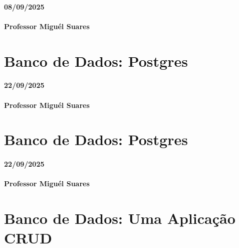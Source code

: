 \documentclass[
]{book}
\begin{document}
\subsubsection*{08/09/2025}\label{section-8}

\subsubsection*{Professor Miguél Suares}\label{professor-miguuxe9l-suares-8}

\chapter{Banco de Dados: Postgres}\label{banco-de-dados-postgres}

\subsubsection*{22/09/2025}\label{section-9}

\subsubsection*{Professor Miguél Suares}\label{professor-miguuxe9l-suares-9}

\chapter{Banco de Dados: Postgres}\label{banco-de-dados-postgres-1}

\subsubsection*{22/09/2025}\label{section-10}

\subsubsection*{Professor Miguél Suares}\label{professor-miguuxe9l-suares-10}

\chapter{Banco de Dados: Uma Aplicação CRUD}\label{banco-de-dados-uma-aplicauxe7uxe3o-crud-1}
\end{document}
